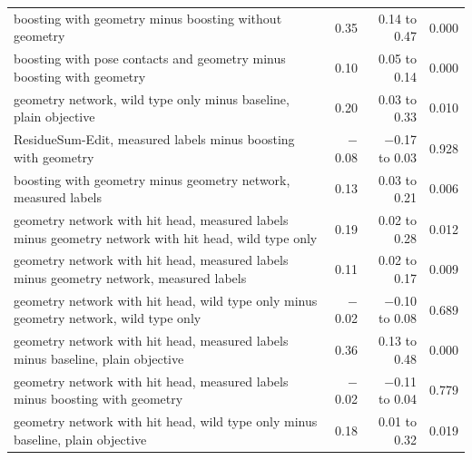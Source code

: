 \begin{longtable}{p{8.6cm}rrr}
boosting with geometry minus boosting without geometry & 0.35 & 0.14 to 0.47 & 0.000 \\
boosting with pose contacts and geometry minus boosting with geometry & 0.10 & 0.05 to 0.14 & 0.000 \\
geometry network, wild type only minus baseline, plain objective & 0.20 & 0.03 to 0.33 & 0.010 \\
ResidueSum-Edit, measured labels minus boosting with geometry & $-$0.08 & $-$0.17 to 0.03 & 0.928 \\
boosting with geometry minus geometry network, measured labels & 0.13 & 0.03 to 0.21 & 0.006 \\
geometry network with hit head, measured labels minus geometry network with hit head, wild type only & 0.19 & 0.02 to 0.28 & 0.012 \\
geometry network with hit head, measured labels minus geometry network, measured labels & 0.11 & 0.02 to 0.17 & 0.009 \\
geometry network with hit head, wild type only minus geometry network, wild type only & $-$0.02 & $-$0.10 to 0.08 & 0.689 \\
geometry network with hit head, measured labels minus baseline, plain objective & 0.36 & 0.13 to 0.48 & 0.000 \\
geometry network with hit head, measured labels minus boosting with geometry & $-$0.02 & $-$0.11 to 0.04 & 0.779 \\
geometry network with hit head, wild type only minus baseline, plain objective & 0.18 & 0.01 to 0.32 & 0.019 \\
\bottomrule
\end{longtable}
